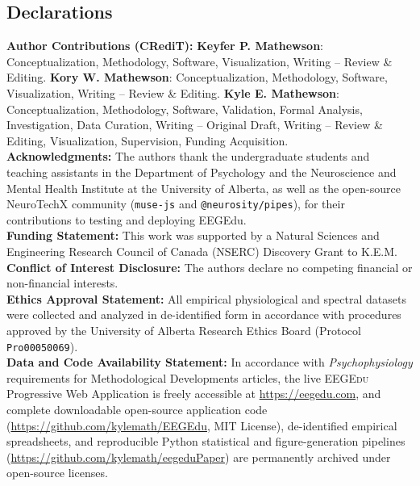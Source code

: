 \documentclass[11pt,letterpaper]{article}
\begin{document}
\subsection*{Declarations}
\noindent\textbf{Author Contributions (CRediT):} \textbf{Keyfer P. Mathewson}: Conceptualization, Methodology, Software, Visualization, Writing -- Review \& Editing. \textbf{Kory W. Mathewson}: Conceptualization, Methodology, Software, Visualization, Writing -- Review \& Editing. \textbf{Kyle E. Mathewson}: Conceptualization, Methodology, Software, Validation, Formal Analysis, Investigation, Data Curation, Writing -- Original Draft, Writing -- Review \& Editing, Visualization, Supervision, Funding Acquisition.\\[3pt]
\noindent\textbf{Acknowledgments:} The authors thank the undergraduate students and teaching assistants in the Department of Psychology and the Neuroscience and Mental Health Institute at the University of Alberta, as well as the open-source NeuroTechX community (\texttt{muse-js} and \texttt{@neurosity/pipes}), for their contributions to testing and deploying EEGEdu.\\[3pt]
\noindent\textbf{Funding Statement:} This work was supported by a Natural Sciences and Engineering Research Council of Canada (NSERC) Discovery Grant to K.E.M.\\[3pt]
\noindent\textbf{Conflict of Interest Disclosure:} The authors declare no competing financial or non-financial interests.\\[3pt]
\noindent\textbf{Ethics Approval Statement:} All empirical physiological and spectral datasets were collected and analyzed in de-identified form in accordance with procedures approved by the University of Alberta Research Ethics Board (Protocol \texttt{Pro00050069}).\\[3pt]
\noindent\textbf{Data and Code Availability Statement:} In accordance with \emph{Psychophysiology} requirements for Methodological Developments articles, the live \textsc{EEGEdu} Progressive Web Application is freely accessible at \url{https://eegedu.com}, and complete downloadable open-source application code (\url{https://github.com/kylemath/EEGEdu}, MIT License), de-identified empirical spreadsheets, and reproducible Python statistical and figure-generation pipelines (\url{https://github.com/kylemath/eegeduPaper}) are permanently archived under open-source licenses.



\end{document}
